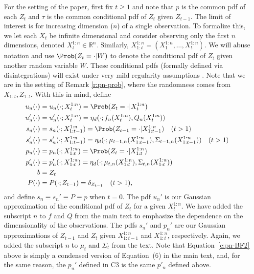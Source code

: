 For the setting of the paper, first fix $t\geq 1$ and note that $p$ is the common pdf of each $Z_t$ and $\tau$ is the common conditional pdf of $Z_t$ given $Z_{t-1}$. The limit of interest is for increasing dimension ($n$) of a single observation. To formalize this, we let each $X_t$ be infinite dimensional and consider observing only the first $n$ dimensions, denoted $X_t^{1:n}\in\mathbb{R}^n$. Similarly, $X_{1:t}^{1:n}=(X_1^{1:n},\dotsc,X_t^{1:n})$. We will abuse notation and use $\Prob(Z_t=\cdot|W)$ to denote the conditional pdf of $Z_t$ given another random variable $W$. These conditional pdfs (formally defined via disintegrations) will exist under very mild regularity assumptions \cite{Cha97}. Note that we are in the setting of Remark \ref{r:pn-prob}, where the randomness comes from $X_{1:t},Z_{1:t}$. With this in mind, define
\[ \begin{aligned}
u_n(\cdot) &= u_n(\cdot;X_t^{1:n}) = \Prob(Z_t=\cdot|X_t^{1:n}) \\
u'_n(\cdot) &= u'_n(\cdot;X_t^{1:n}) = \eta_d(\cdot; f_n(X_t^{1:n}), Q_n(X_t^{1:n})) \\
s_n(\cdot) &= s_n(\cdot;X_{1:t-1}^{1:n}) = \Prob(Z_{t-1}=\cdot|X_{1:t-1}^{1:n}) \quad (t>1)\\  
s'_n(\cdot) &= s'_n(\cdot;X_{1:t-1}^{1:n}) = \eta_d(\cdot; \mu_{t-1,n}(X_{1:t-1}^{1:n}), \Sigma_{t-1,n}(X_{1:t-1}^{1:n})) \quad (t>1) \\
p_n(\cdot) &= p_n(\cdot;X_{1:t}^{1:n}) = \Prob(Z_{t}=\cdot|X_{1:t}^{1:n}) \\  
p'_n(\cdot) &= p'_n(\cdot;X_{1:t}^{1:n}) = \eta_d(\cdot; \mu_{t,n}(X_{1:t}^{1:n}), \Sigma_{t,n}(X_{1:t}^{1:n})) \\
b &= Z_t \\
P(\cdot) &= P(\cdot;Z_{t-1}) = \delta_{Z_{t-1}} \quad (t>1) ,
\end{aligned} \]
and define $s_n\equiv s_n'\equiv P \equiv p$ when $t=0$. The pdf $u_n'$ is our Gaussian approximation of the conditional pdf of $Z_t$ for a given $X_t^{1:n}$. We have added the subscript $n$ to $f$ and $Q$ from the main text to emphasize the dependence on the dimensionality of the observations. The pdfs $s_n'$ and $p_n'$ are our Gaussian approximations of $Z_{t-1}$ and $Z_t$ given $X_{1:t-1}^{1:n}$ and $X_{1:t}^{1:n}$, respectively. Again, we added the subscript $n$ to $\mu_t$ and $\Sigma_t$ from the text. Note that Equation~\ref{e:pn-BF2} above is simply a condensed version of Equation~(6) in the main text, and, for the same reason, the $p_n'$ defined in C3 is the same $p'_n$ defined above. 

